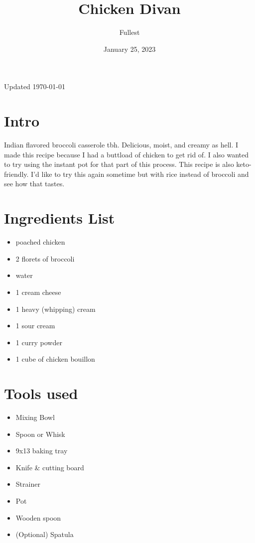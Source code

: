 \documentclass{article}
\title{\textbf{Chicken Divan}}
\author{Fullest}
\date{January 25, 2023}
\let\US\SI
\begin{document}
\maketitle
\thispagestyle{empty}

\begin{multicols}{2}


Updated \today
\section{Intro}
\cite{WEBSITEWITHRECIPE:1}Indian flavored broccoli casserole tbh. Delicious, moist, and creamy as hell. I made this recipe because I had a buttload of chicken to get rid of. I also wanted to try using the instant pot\cite{CHICKEN} for that part of this process. This recipe is also keto-friendly. I'd like to try this again sometime but with rice instead of broccoli and see how that tastes.

\section{Ingredients List}
\begin{itemize}
	\item poached chicken\cite{CHICKEN}
	\item 2 florets of broccoli
	\item water
	\item \US{1}{\cup} cream cheese
	\item \US{1}{\cup} heavy (whipping) cream
	\item \US{1}{\cup} sour cream
	\item \US{1}{\tbsp} curry powder\cite{CURRYPOWDER}
	\item 1 cube of chicken bouillon
\end{itemize}

\section{Tools used}
\begin{itemize}
	\item Mixing Bowl
	\item Spoon or Whisk
	\item 9x13 baking tray
	\item Knife \& cutting board
	\item Strainer
	\item Pot
	\item Wooden spoon
	\item (Optional) Spatula\\\\ %
\end{itemize}


\end{multicols}
\end{document}
